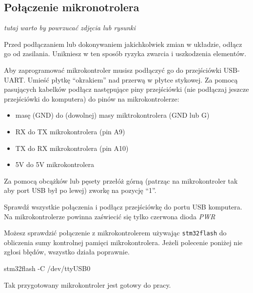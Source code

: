 \documentclass{pdfBooklets}
\begin{document}
\subsection{Połączenie mikronotrolera}
\textit {tutaj warto by powrzucać zdjęcia lub rysunki}

\begin{ProTip}{}
  Przed podłączaniem lub dokonywaniem jakichkolwiek zmian w układzie, odłącz go od zasilania. Unikniesz
  w ten sposób ryzyka zwarcia i uszkodzenia elementów.
\end{ProTip}

Aby zaprogramować mikrokontroler musisz podłączyć go do przejściówki USB-UART. Umieść płytkę ``okrakiem'' nad przerwą
w płytce stykowej. Za pomocą pasujących kabelków podłącz następujące piny przejściówki (nie podłączaj jeszcze
przejściówki do komputera) do pinów na mikrokontrolerze:
\begin{itemize}
\item masę (GND) do (dowolnej) masy miktrokontrolera (GND lub G)
\item RX do TX mikrokontrolera (pin A9)
\item TX do RX mikrokontrolera (pin A10)
\item 5V do 5V mikrokontrolera
\end{itemize}

Za pomocą obcążków lub pęsety przełóż górną (patrząc na mikrokontroler tak aby port USB był po lewej) zworkę na
pozycję ``1''.

Sprawdź wszystkie połączenia i podłącz przejściówkę do portu USB komputera. Na mikrokontrolerze powinna zaświecić się tylko czerwona dioda
\textit{PWR}

Możesz sprawdzić połączenie z mikrokontrolerem używając \Verb$stm32flash$ do obliczenia sumy kontrolnej pamięci mikrokontrolera.
Jeżeli polecenie poniżej nie zgłosi błędów, wszystko działa poprawnie.

\begin{CodeFrame*}[bash]{}
stm32flash -C /dev/ttyUSB0
\end{CodeFrame*}

Tak przygotowany mikrokontroler jest gotowy do pracy.




\end{document}
